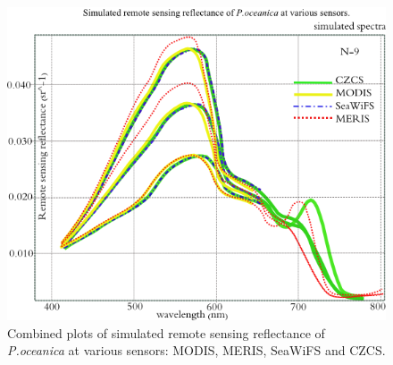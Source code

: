 \documentclass[11pt]{article}
\begin{document}
\begin{figure}
	\centering
	\includegraphics[scale=0.45]{Sensors.png}
	\caption{Combined plots of simulated remote sensing reflectance of \textit{P.oceanica} at various sensors: MODIS, MERIS, SeaWiFS and CZCS.}
	\label{fig:4.6}
\end{figure}
\end{document}
